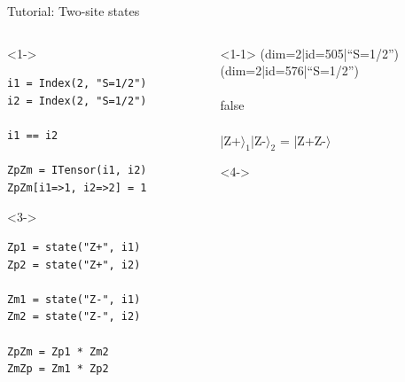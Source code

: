 \begin{frame}[fragile]{Tutorial: Two-site states}

\begin{columns}

\begin{column}{4.5cm}

\begin{onlyenv}<1->
\vspace*{-0.2cm}
\begin{lstlisting}[language=JuliaLocal, style=julia, basicstyle=\small]
i1 = Index(2, "S=1/2")
i2 = Index(2, "S=1/2")

i1 == i2

ZpZm = ITensor(i1, i2)
ZpZm[i1=>1, i2=>2] = 1
\end{lstlisting}
\end{onlyenv}

\begin{onlyenv}<3->
\begin{lstlisting}[language=JuliaLocal, style=julia, basicstyle=\small]
Zp1 = state("Z+", i1)
Zp2 = state("Z+", i2)

Zm1 = state("Z-", i1)
Zm2 = state("Z-", i2)

ZpZm = Zp1 * Zm2
ZmZp = Zm1 * Zp2
\end{lstlisting}
\end{onlyenv}

\end{column}

\begin{column}{5cm}

\begin{onlyenv}<1-1>
(dim=2|id=505|``S=1/2'') \\
(dim=2|id=576|``S=1/2'') \\
~\\
false \\
~\\
|Z+$\rangle_1$|Z-$\rangle_2$ = |Z+Z-$\rangle$ \\
\end{onlyenv}

\begin{onlyenv}<4->
~\\
~\\
\end{onlyenv}


\end{column}
\end{columns}
\end{frame}
